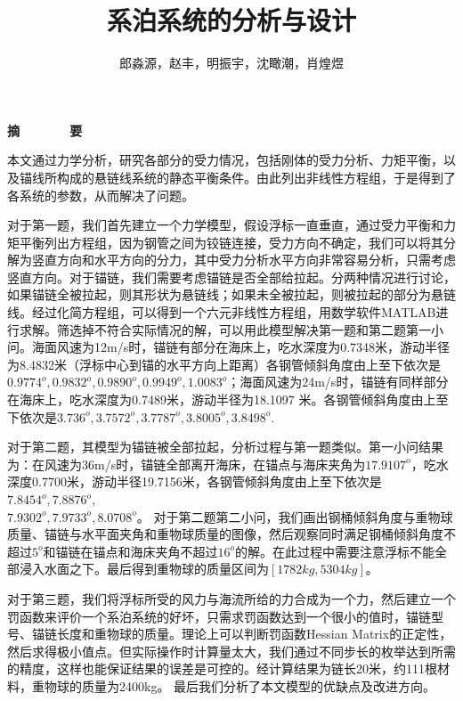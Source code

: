 \documentclass[a4paper,12pt]{ctexart}
\title{\Huge 系泊系统的分析与设计}
\author{郎淼源，赵丰，明振宇，沈瞰潮，肖煌煜}
\date{}
\begin{document}
\maketitle
\begin{center}
\textbf{\Large 摘~~~~~~~要}
\end{center}

本文通过力学分析，研究各部分的受力情况，包括刚体的受力分析、力矩平衡，以及锚线所构成的悬链线系统的静态平衡条件。由此列出非线性方程组，于是得到了各系统的参数，从而解决了问题。

对于第一题，我们首先建立一个力学模型，假设浮标一直垂直，通过受力平衡和力矩平衡列出方程组，因为钢管之间为铰链连接，受力方向不确定，我们可以将其分解为竖直方向和水平方向的分力，其中受力分析水平方向非常容易分析，只需考虑竖直方向。对于锚链，我们需要考虑锚链是否全部给拉起。分两种情况进行讨论，如果锚链全被拉起，则其形状为悬链线；如果未全被拉起，则被拉起的部分为悬链线。经过化简方程组，可以得到一个六元非线性方程组，用数学软件MATLAB进行求解。筛选掉不符合实际情况的解，可以用此模型解决第一题和第二题第一小问。海面风速为12m/s时，锚链有部分在海床上，吃水深度为0.7348米，游动半径为8.4832米（浮标中心到锚的水平方向上距离）各钢管倾斜角度由上至下依次是$0.9774^o,0.9832^o,0.9890^o,0.9949^o,1.0083^o$；海面风速为24m/s时，锚链有同样部分在海床上，吃水深度为0.7489米，游动半径为18.1097 米。各钢管倾斜角度由上至下依次是$3.736^o,3.7572^o,3.7787^o,3.8005^o,3.8498^o$.

对于第二题，其模型为锚链被全部拉起，分析过程与第一题类似。第一小问结果为：在风速为36m/s时，锚链全部离开海床，在锚点与海床夹角为$17.9107^o$，吃水深度0.7700米，游动半径19.7156米，各钢管倾斜角度由上至下依次是$7.8454^o,7.8876^o$,\\
$7.9302^o,7.9733^o,8.0708^o$。 对于第二题第二小问，我们画出钢桶倾斜角度与重物球质量、锚链与水平面夹角和重物球质量的图像，然后观察同时满足钢桶倾斜角度不超过$5^o$和锚链在锚点和海床夹角不超过$16^o$的解。在此过程中需要注意浮标不能全部浸入水面之下。最后得到重物球的质量区间为$[1782kg,5304kg]$。

对于第三题，我们将浮标所受的风力与海流所给的力合成为一个力，然后建立一个罚函数来评价一个系泊系统的好坏，只需求罚函数达到一个很小的值时，锚链型号、锚链长度和重物球的质量。理论上可以判断罚函数Hessian Matrix的正定性，然后求得极小值点。但实际操作时计算量太大，我们通过不同步长的枚举达到所需的精度，这样也能保证结果的误差是可控的。经计算结果为链长20米，约111根材料\uppercase\expandafter{}，重物球的质量为2400kg。
最后我们分析了本文模型的优缺点及改进方向。\\
\end{document}
